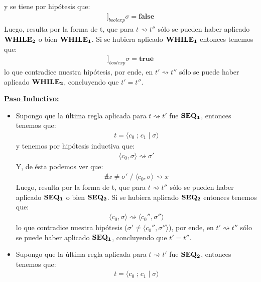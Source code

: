 \documentclass[a4paper,10pt]{article}
\begin{document}
\begin{itemize}
			y se tiene por hipótesis que:
				\begin{align*} [\![b]\!]_{boolexp}\sigma = \textbf{false} \end{align*}
			Luego, resulta por la forma de t, que para $t \rightsquigarrow t''$ sólo se pueden haber aplicado ${\bf WHILE_{2}}$ o bien ${\bf WHILE_{1}}$.
			Si se hubiera aplicado ${\bf WHILE_{1}}$ entonces tenemos que:
				\begin{align*} [\![b]\!]_{boolexp}\sigma = \textbf{true} \end{align*}
			lo que contradice nuestra hipótesis, por ende, en $t' \rightsquigarrow t''$ sólo se puede haber aplicado ${\bf WHILE_{2}}$, concluyendo que $t'= t''$.
			\\
	\end{itemize}
	\underline{\bf Paso Inductivo:}
	\begin{itemize}
		\item Supongo que la última regla aplicada para $t \rightsquigarrow t'$ fue ${\bf SEQ_{1}}$, entonces tenemos que:
				\begin{align*} t = \langle c_{0} \;\textbf{;}\; c_{1} \;|\; \sigma\rangle \end{align*}
			y tenemos por hipótesis inductiva que:
				\begin{align*} \langle c_{0},\sigma\rangle \rightsquigarrow \sigma' \end{align*}
			Y, de ésta podemos ver que:
				\begin{align*} \nexists x \neq \sigma' \;{\big /}\; \langle c_{0},\sigma\rangle \rightsquigarrow x \end{align*}
			Luego, resulta por la forma de t, que para $t \rightsquigarrow t''$ sólo se pueden haber aplicado ${\bf SEQ_{1}}$ o bien ${\bf SEQ_{2}}$.
			Si se hubiera aplicado ${\bf SEQ_{2}}$ entonces tenemos que:
				\begin{align*} \langle c_{0},\sigma\rangle \rightsquigarrow \langle c_{0}'',\sigma'' \rangle \end{align*}
			lo que contradice nuestra hipótesis ($\sigma' \neq \langle c_{0}'',\sigma'' \rangle$), por ende, en $t' \rightsquigarrow t''$ sólo se puede haber aplicado ${\bf SEQ_{1}}$, concluyendo que $t'= t''$.
			\\
			\item Supongo que la última regla aplicada para $t \rightsquigarrow t'$ fue ${\bf SEQ_{2}}$, entonces tenemos que:
				\begin{align*} t = \langle c_{0} \;\textbf{;}\; c_{1} \;|\; \sigma\rangle \end{align*}

\end{itemize}
\end{document}
